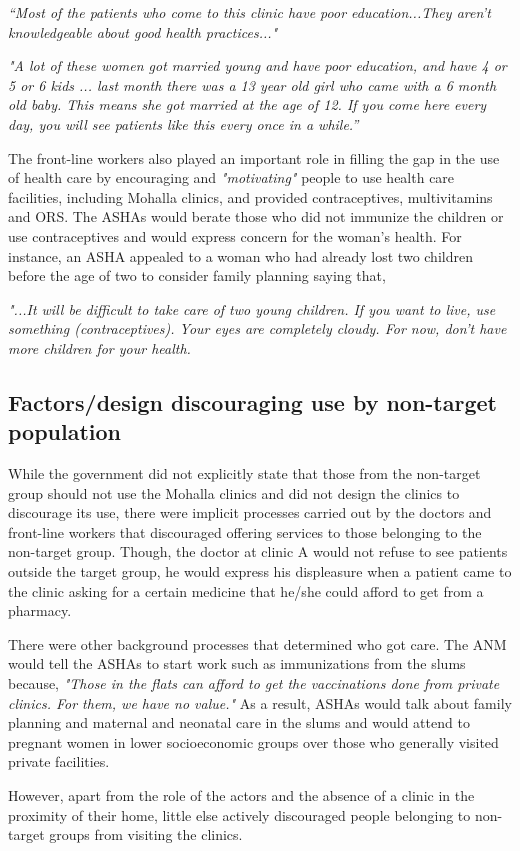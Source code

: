\textit{“Most of the patients who come to this clinic have poor education...They aren’t knowledgeable about good health practices..."}

\textit{"A lot of these women got married young and have poor education, and have 4 or 5 or 6 kids ... last month there was a 13 year old girl who came with a 6 month old baby. This means she got married at the age of 12. If you come here every day, you will see patients like this every once in a while.”}

The front-line workers also played an important role in filling the gap in the use of health care by encouraging and \textit{"motivating"} people to use health care facilities, including Mohalla clinics, and provided contraceptives, multivitamins and ORS. The ASHAs would berate those who did not immunize the children or use contraceptives and would express concern for the woman's health. For instance, an ASHA appealed to a woman who had already lost two children before the age of two to consider family planning saying that, 

\textit{"...It will be difficult to take care of two young children. If you want to live, use something (contraceptives). Your eyes are completely cloudy. For now, don’t have more children for your health.}

\subsection{Factors/design discouraging use by non-target population}
While the government did not explicitly state that those from the non-target group should not use the Mohalla clinics and did not design the clinics to discourage its use, there were implicit processes carried out by the doctors and front-line workers that discouraged offering services to those belonging to the non-target group. Though, the doctor at clinic A would not refuse to see patients outside the target group, he would express his displeasure when a patient came to the clinic asking for a certain medicine that he/she could afford to get from a pharmacy.

There were other background processes that determined who got care. The ANM would tell the ASHAs to start work such as immunizations from the slums because, \textit{"Those in the flats can afford to get the vaccinations done from private clinics. For them, we have no value."} As a result, ASHAs would talk about family planning and maternal and neonatal care in the slums and would attend to pregnant women in lower socioeconomic groups over those who generally visited private facilities. %

However, apart from the role of the actors and the absence of a clinic in the proximity of their home, little else actively discouraged people belonging to non-target groups from visiting the clinics.